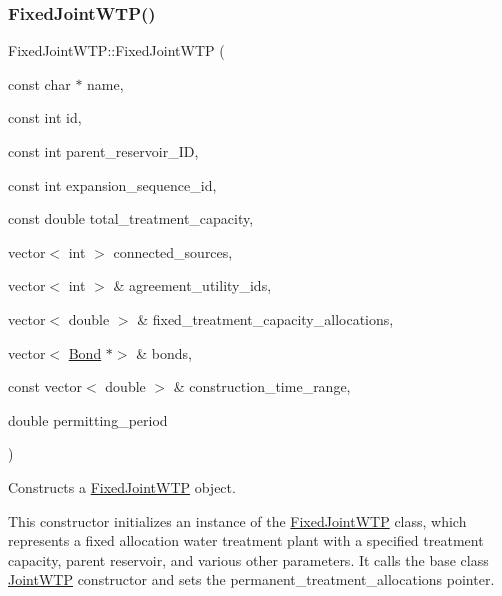 \subsubsection{\texorpdfstring{Fixed\+Joint\+W\+T\+P()}{FixedJointWTP()}\hspace{0.1cm}{\footnotesize\ttfamily [1/2]}}
{\footnotesize\ttfamily Fixed\+Joint\+W\+T\+P\+::\+Fixed\+Joint\+W\+TP (\begin{DoxyParamCaption}\item[{const char $\ast$}]{name,  }\item[{const int}]{id,  }\item[{const int}]{parent\+\_\+reservoir\+\_\+\+ID,  }\item[{const int}]{expansion\+\_\+sequence\+\_\+id,  }\item[{const double}]{total\+\_\+treatment\+\_\+capacity,  }\item[{vector$<$ int $>$}]{connected\+\_\+sources,  }\item[{vector$<$ int $>$ \&}]{agreement\+\_\+utility\+\_\+ids,  }\item[{vector$<$ double $>$ \&}]{fixed\+\_\+treatment\+\_\+capacity\+\_\+allocations,  }\item[{vector$<$ \mbox{\hyperlink{classBond}{Bond}} $\ast$$>$ \&}]{bonds,  }\item[{const vector$<$ double $>$ \&}]{construction\+\_\+time\+\_\+range,  }\item[{double}]{permitting\+\_\+period }\end{DoxyParamCaption})}



Constructs a \mbox{\hyperlink{classFixedJointWTP}{Fixed\+Joint\+W\+TP}} object. 

This constructor initializes an instance of the {\ttfamily \mbox{\hyperlink{classFixedJointWTP}{Fixed\+Joint\+W\+TP}}} class, which represents a fixed allocation water treatment plant with a specified treatment capacity, parent reservoir, and various other parameters. It calls the base class {\ttfamily \mbox{\hyperlink{classJointWTP}{Joint\+W\+TP}}} constructor and sets the {\ttfamily permanent\+\_\+treatment\+\_\+allocations} pointer.


